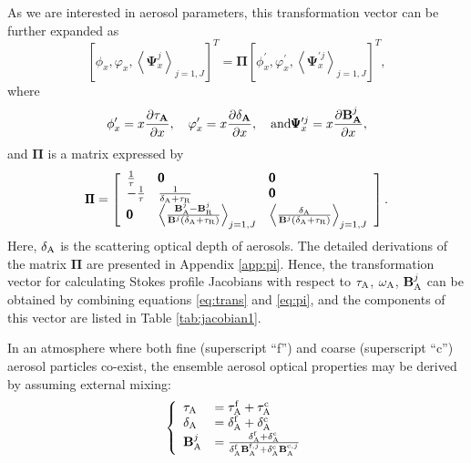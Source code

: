 As we are interested in aerosol parameters, this transformation vector
can be further expanded as 
\begin{equation}
\left[ \phi_x, \varphi_x, \left< \pmb{\Psi}_x^j\right>_{j=1,J}\right]^T
=\pmb{\Pi} \left[ \phi_x^\prime, \varphi_x^\prime, \left<
\pmb{\Psi}_x^{\prime j}\right>_{j=1,J}\right]^T, \label{eq:trans}
\end{equation}
where
\begin{equation}
\phi_x^\prime = x\frac{\partial\tau_\mathbf{A}}{\partial x}, \quad 
\varphi_x^\prime = x\frac{\partial\delta_\mathbf{A}}{\partial x}, \quad  \mbox{and} 
\pmb{\Psi}_x^{\prime j} = x\frac{\partial\mathbf{B}_\mathbf{A}^j}{\partial x},
\label{eq:alopt}
\end{equation}
and $\pmb{\Pi}$ is a matrix expressed by
\begin{equation}
\pmb{\Pi} = \left[ 
            \begin{array}{lll}
            \frac{1}{\tau}  & \pmb{0} & \pmb{0} \\
            -\frac{1}{\tau} & \frac{1}{\delta_\text{A}+\tau_\text{R}} & \pmb{0} \\
            \pmb{0} & \left<
\frac{\mathbf{B}_\text{A}^j-\mathbf{B}_\text{R}^j}{\mathbf{B}^j(\delta_\text{A}+\tau_\text{R})}\right>_{j=1,J} & 
\left< \frac{\delta_\text{A}}{\mathbf{B}^j(\delta_\text{A}+\tau_\text{R})}\right>_{j=1,J}
            \end{array}
            \right]. \label{eq:pi}
\end{equation}
Here, $\delta_\text{A}$ is the scattering optical depth of aerosols. The detailed
derivations of the matrix $\pmb{\Pi}$ are presented in Appendix \ref{app:pi}. 
Hence, the transformation vector for calculating Stokes profile Jacobians 
with respect to $\tau_\text{A}$, $\omega_\text{A}$, $\mathbf{B}_\text{A}^j$ can be obtained by combining 
equations \eqref{eq:trans} and \eqref{eq:pi}, and the components of 
this vector are listed in Table \ref{tab:jacobian1}.

In an atmosphere where both fine (superscript “f”) and coarse
(superscript “c”) aerosol particles co-exist, the ensemble aerosol
optical properties may be derived by assuming external mixing:
\begin{equation}
\left\{  
\begin{array}{ll}
\tau_\text{A} &= \tau_\text{A}^\text{f} + \tau_\text{A}^\text{c} \\
\delta_\text{A} &= \delta_\text{A}^\text{f} + \delta_\text{A}^\text{c} \\
\mathbf{B}_\text{A}^j &= \frac{\delta_\text{A}^\text{f} + \delta_\text{A}^\text{c}}
           {\delta_\text{A}^\text{f}\mathbf{B}_\text{A}^{\text{f},j} + \delta_\text{A}^\text{c}\mathbf{B}_\text{A}^{\text{c},j} }
\end{array} 
\right.
\end{equation}


